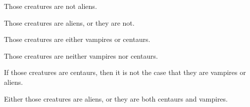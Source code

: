 \problempart 
\begin{earg}
\item Those creatures are not aliens.
\item[] 
\item Those creatures are aliens, or they are not.
\item[]  
\item Those creatures are either vampires or centaurs.
\item[] 
\item Those creatures are neither vampires nor centaurs.
\item[] 
\item If those creatures are centaurs, then it is not the case that they are vampires or aliens.
\item[] 
\item Either those creatures are aliens, or they are both centaurs and vampires.
\item[] 
\end{earg}

